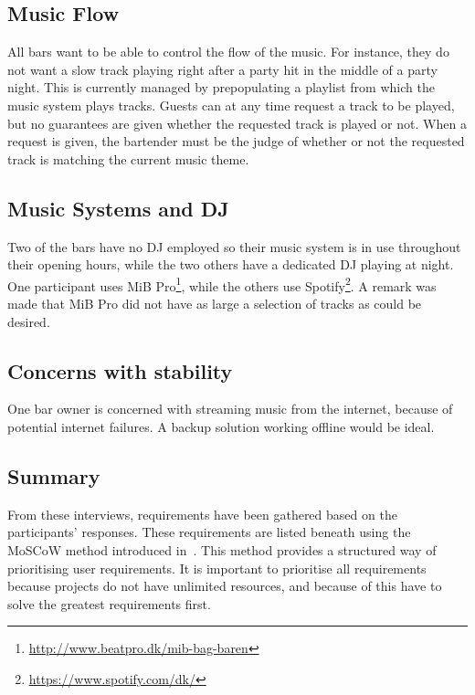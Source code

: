 \subsection{Music Flow}
\label{sub:MusicFlow}

All bars want to be able to control the flow of the music. For instance, they do not want a slow track playing right after a party hit in the middle of a party night. This is currently managed by prepopulating a playlist from which the music system plays tracks. Guests can at any time request a track to be played, but no guarantees are given whether the requested track is played or not. When a request is given, the bartender must be the judge of whether or not the requested track is matching the current music theme.

\subsection{Music Systems and DJ}
\label{sub:differences}
Two of the bars have no DJ employed so their music system is in use throughout their opening hours, while the two others have a dedicated DJ playing at night. One participant uses MiB Pro\footnote{\url{http://www.beatpro.dk/mib-bag-baren}}, while the others use Spotify\footnote{\url{https://www.spotify.com/dk/}}. A remark was made that MiB Pro did not have as large a selection of tracks as could be desired.

\subsection{Concerns with stability}
\label{sub:specific_remarks}

One bar owner is concerned with streaming music from the internet, because of potential internet failures. A backup solution working offline would be ideal.

\subsection{Summary}
\label{sub:summary}

From these interviews, requirements have been gathered based on the participants' responses. These requirements are listed beneath using the MoSCoW method introduced in~\cite{benyon2013designing}. This method provides a structured way of prioritising user requirements. It is important to prioritise all requirements because projects do not have unlimited resources, and because of this have to solve the greatest requirements first.

